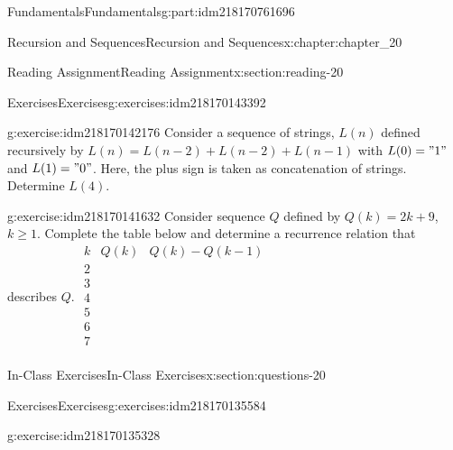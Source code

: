 \documentclass[oneside,10pt,]{book}
\numberwithin{equation}{section}
\begin{document}
\begin{partptx}{Fundamentals}{}{Fundamentals}{}{}{g:part:idm218170761696}
\begin{chapterptx}{Recursion and Sequences}{}{Recursion and Sequences}{}{}{x:chapter:chapter_20}
\begin{sectionptx}{Reading Assignment}{}{Reading Assignment}{}{}{x:section:reading-20}
\typeout{************************************************}
%
\begin{exercises-subsection-numberless}{Exercises}{}{Exercises}{}{}{g:exercises:idm218170143392}
\par\medskip\noindent%
%
\begin{exercisegroup}
\begin{divisionexerciseeg}{1}{}{}{g:exercise:idm218170142176}%
Consider a sequence of strings, \(L(n)\) defined recursively by \(L(n)=L(n-2)+L(n-2)+L(n-1)\) with \(L(0)="1"\) and \(L(1)="0"\). Here, the plus sign is taken as concatenation of strings.  Determine \(L(4)\).%
\end{divisionexerciseeg}%
\begin{divisionexerciseeg}{2}{}{}{g:exercise:idm218170141632}%
Consider sequence \(Q\) defined by \(Q(k) = 2k + 9\), \(k \geq  1\). Complete the table below and determine a recurrence relation that describes \(Q\). \(\begin{array}{c|c|c}
k & Q(k)  & Q(k)-Q(k-1) \\
\hline
2 &   &   \\
3 &   &   \\
4 & \text{  } &   \\
5 &   &   \\
6 &   &   \\
7 &   &   \\
\end{array}\)%
\end{divisionexerciseeg}%
\end{exercisegroup}
\par\medskip\noindent
\end{exercises-subsection-numberless}
\end{sectionptx}
%
%
\typeout{************************************************}
\typeout{************************************************}
%
\begin{sectionptx}{In-Class Exercises}{}{In-Class Exercises}{}{}{x:section:questions-20}
%
%
%
\typeout{************************************************}
\typeout{************************************************}
%
\begin{exercises-subsection-numberless}{Exercises}{}{Exercises}{}{}{g:exercises:idm218170135584}
\par\medskip\noindent%
%
\begin{exercisegroup}
\begin{divisionexerciseeg}{1}{}{}{g:exercise:idm218170135328}%

\end{divisionexerciseeg}
\end{exercisegroup}
\end{exercises-subsection-numberless}
\end{sectionptx}
\end{chapterptx}
\end{partptx}
\end{document}
